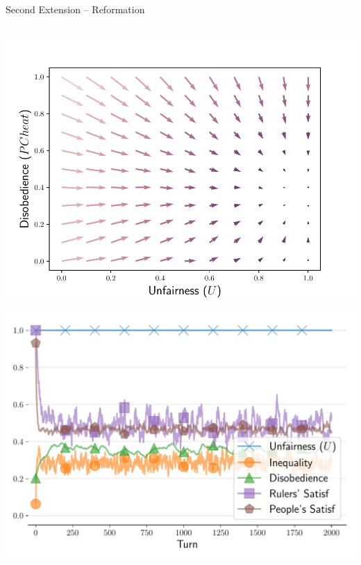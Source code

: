 \documentclass[xcolor={table}]{beamer}
\begin{document}
\begin{frame}[fragile=singleslide,t]
\begin{columns}[T]
\begin{column}{.58\textwidth}
\begin{block}{Second Extension -- Reformation}
\begin{columns}[T]
\begin{column}{.333\textwidth}
\begin{center}
\includegraphics[width=\linewidth]{img/phaseapolitical}

\includegraphics[width=.9\linewidth]{img/timeapolitical.pdf}
\end{center}

\end{column}
\end{columns}

\end{block} 



\end{column}
\end{columns}


\end{frame}
\end{document}
